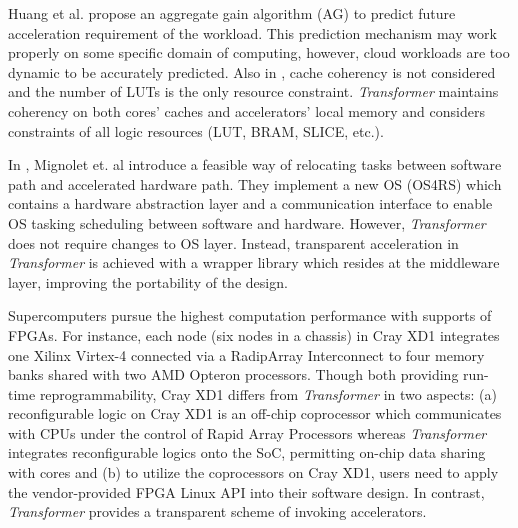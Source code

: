 Huang et al. propose an aggregate gain algorithm (AG)
\cite{Huang:2009hs} to predict future acceleration requirement of the
workload. This prediction mechanism may work properly on some specific
domain of computing, however, cloud workloads are too dynamic to be
accurately predicted. Also in \cite{Huang:2009hs}, cache coherency is not considered and the
number of LUTs is the only resource constraint. {\em Transformer}
maintains coherency on both cores' caches and accelerators' local
memory and considers constraints of all logic resources (LUT, BRAM,
SLICE, etc.).


In \cite{Mignolet:2003gr}, Mignolet et. al introduce a feasible way of
relocating tasks between software path and accelerated hardware
path. They implement a new OS (OS4RS) which contains a hardware
abstraction layer and a communication interface to enable OS tasking
scheduling between software and hardware. 
However, {\em Transformer} does not require changes to OS
layer. Instead, transparent acceleration in {\em Transformer} is
achieved with a wrapper library which resides at the middleware layer,
improving the portability of the design.


Supercomputers pursue the highest computation performance
\cite{Ulmer:2005vh} with supports of FPGAs. For instance, each node
(six nodes in a chassis) in Cray XD1 integrates one Xilinx Virtex-4
connected via a RadipArray Interconnect to four memory banks shared
with two AMD Opteron processors. Though both providing run-time
reprogrammability, Cray XD1 differs from {\em Transformer} in two
aspects: (a) reconfigurable logic on Cray XD1 is an off-chip
coprocessor which communicates with CPUs under the control of Rapid
Array Processors whereas {\em Transformer} integrates reconfigurable
logics onto the SoC, permitting on-chip data sharing with cores and (b)
to utilize the coprocessors on Cray XD1, users need to apply the
vendor-provided FPGA Linux API into their software design. In
contrast, {\em Transformer} provides a transparent scheme of invoking
accelerators.

